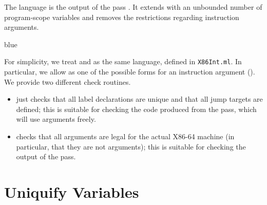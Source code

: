 \documentclass[11pt]{book}
\newenvironment{ocamlx}{
  \begin{color}{blue}
}
{
  \end{color}
}
\begin{document}
The \LangXVar{} language is the output of the pass
. It extends \LangXInt{} with an unbounded
number of program-scope variables and removes the restrictions
regarding instruction arguments.
\begin{ocamlx}
For simplicity, we treat \LangXInt{}  and \LangXVar{} as the same
  language, defined in \texttt{X86Int.ml}. In particular, we allow 
  as one of the possible forms for an instruction argument ().
  We provide two different check routines.
  \begin{itemize}
    \item {}
      just checks that all label
      declarations are unique and that all jump targets are defined; this
      is suitable for checking the code produced from the 
      pass, which will use  arguments freely.
    \item 
       checks that all arguments are legal for the
      actual X86-64 machine (in particular, that they are not  arguments);
      this is suitable for checking the output of the  pass.
  \end{itemize}
\end{ocamlx}

\section{Uniquify Variables}
\label{sec:uniquify-Rvar}
\end{document}
